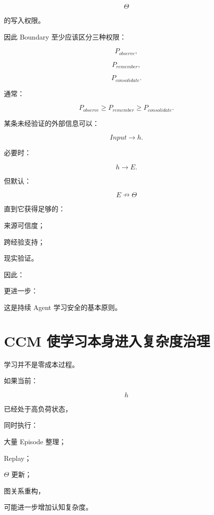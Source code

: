 \[
\Theta
\]

的写入权限。

因此 Boundary 至少应该区分三种权限：

\[
P_{observe},
\]

\[
P_{remember},
\]

\[
P_{consolidate}.
\]

通常：

\[
\boxed{
P_{observe}
\ge
P_{remember}
\ge
P_{consolidate}.
}
\]

某条未经验证的外部信息可以：

\[
Input\rightarrow h.
\]

必要时：

\[
h\rightarrow E.
\]

但默认：

\[
E\nrightarrow\Theta
\]

直到它获得足够的：

来源可信度；

跨经验支持；

现实验证。

因此：

\begin{statementbox}
\centering
{}
\end{statementbox}

更进一步：

\begin{statementbox}
\centering
{}
\end{statementbox}

这是持续 Agent 学习安全的基本原则。


\section{CCM 使学习本身进入复杂度治理}

学习并不是零成本过程。

如果当前：

\[
h
\]

已经处于高负荷状态，

同时执行：

大量 Episode 整理；

Replay；

\(\Theta\) 更新；

图关系重构，

可能进一步增加认知复杂度。

